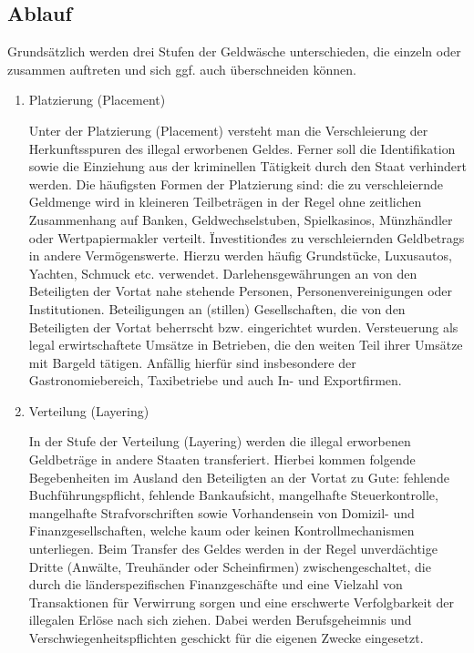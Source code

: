 \documentclass{article}
\begin{document}
        \subsection[Ablauf]{Ablauf}

                Grundsätzlich werden drei Stufen der Geldwäsche unterschieden, die einzeln oder zusammen auftreten und sich ggf. auch überschneiden können.

                \begin{enumerate}

                    \item Platzierung (Placement)

                        Unter der Platzierung (Placement) versteht man die Verschleierung der Herkunftsspuren des illegal erworbenen Geldes. Ferner soll die Identifikation sowie die Einziehung aus der kriminellen Tätigkeit durch den Staat verhindert werden. Die häufigsten Formen der Platzierung sind:
                        die zu verschleiernde Geldmenge wird in kleineren Teilbeträgen in der Regel ohne zeitlichen Zusammenhang auf Banken, Geldwechselstuben, Spielkasinos, Münzhändler oder Wertpapiermakler verteilt.
                        \"Investition\" des zu verschleiernden Geldbetrags in andere Vermögenswerte. Hierzu werden häufig Grundstücke, Luxusautos, Yachten, Schmuck etc. verwendet.
                        Darlehensgewährungen an von den Beteiligten der Vortat nahe stehende Personen, Personenvereinigungen oder Institutionen.
                        Beteiligungen an (stillen) Gesellschaften, die von den Beteiligten der Vortat beherrscht bzw. eingerichtet wurden.
                        Versteuerung als legal erwirtschaftete Umsätze in Betrieben, die den weiten Teil ihrer Umsätze mit Bargeld tätigen. Anfällig hierfür sind insbesondere der Gastronomiebereich, Taxibetriebe und auch In- und Exportfirmen.

                    \item Verteilung (Layering)

                        In der Stufe der Verteilung (Layering) werden die illegal erworbenen Geldbeträge in andere Staaten transferiert. Hierbei kommen folgende Begebenheiten im Ausland den Beteiligten an der Vortat zu Gute:
                        fehlende Buchführungspflicht,
                        fehlende Bankaufsicht,
                        mangelhafte Steuerkontrolle,
                        mangelhafte Strafvorschriften sowie
                        Vorhandensein von Domizil- und Finanzgesellschaften, welche kaum oder keinen Kontrollmechanismen unterliegen.
                        Beim Transfer des Geldes werden in der Regel unverdächtige Dritte (Anwälte, Treuhänder oder Scheinfirmen) zwischengeschaltet, die durch die länderspezifischen Finanzgeschäfte und eine Vielzahl von Transaktionen für Verwirrung sorgen und eine erschwerte Verfolgbarkeit der illegalen Erlöse nach sich ziehen. Dabei werden Berufsgeheimnis und Verschwiegenheitspflichten geschickt für die eigenen Zwecke eingesetzt.


\end{enumerate}
\end{document}

